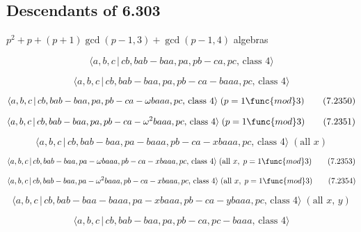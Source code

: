\documentclass[10pt]{article}
\begin{document}
\subsection{Descendants of 6.303}

$p^{2}+p+(p+1)\gcd (p-1,3)+\gcd (p-1,4)$ algebras

\begin{equation}
\langle a,b,c\,|\,cb,bab-baa,pa,pb-ca,pc,\,\text{class }4\rangle 
\tag{7.2348}
\end{equation}

\begin{equation}
\langle a,b,c\,|\,cb,bab-baa,pa,pb-ca-baaa,pc,\,\text{class }4\rangle 
\tag{7.2349}
\end{equation}

\begin{equation}
\langle a,b,c\,|\,cb,bab-baa,pa,pb-ca-\omega baaa,pc,\,\text{class }4\rangle
\;(p=1\func{mod}3)  \tag{7.2350}
\end{equation}

\begin{equation}
\langle a,b,c\,|\,cb,bab-baa,pa,pb-ca-\omega ^{2}baaa,pc,\,\text{class }%
4\rangle \;(p=1\func{mod}3)  \tag{7.2351}
\end{equation}

\begin{equation}
\langle a,b,c\,|\,cb,bab-baa,pa-baaa,pb-ca-xbaaa,pc,\,\text{class }4\rangle
\;(\text{all }x)  \tag{7.2352}
\end{equation}

\begin{equation}
\langle a,b,c\,|\,cb,bab-baa,pa-\omega baaa,pb-ca-xbaaa,pc,\,\text{class }%
4\rangle \;(\text{all }x,\;p=1\func{mod}3)  \tag{7.2353}
\end{equation}

\begin{equation}
\langle a,b,c\,|\,cb,bab-baa,pa-\omega ^{2}baaa,pb-ca-xbaaa,pc,\,\text{class 
}4\rangle \;(\text{all }x,\;p=1\func{mod}3)  \tag{7.2354}
\end{equation}

\begin{equation}
\langle a,b,c\,|\,cb,bab-baa-baaa,pa-xbaaa,pb-ca-ybaaa,pc,\,\text{class }%
4\rangle \;(\text{all }x,\,y)  \tag{7.2355}
\end{equation}

\begin{equation}
\langle a,b,c\,|\,cb,bab-baa,pa,pb-ca,pc-baaa,\,\text{class }4\rangle 
\tag{7.2356}
\end{equation}
\end{document}
